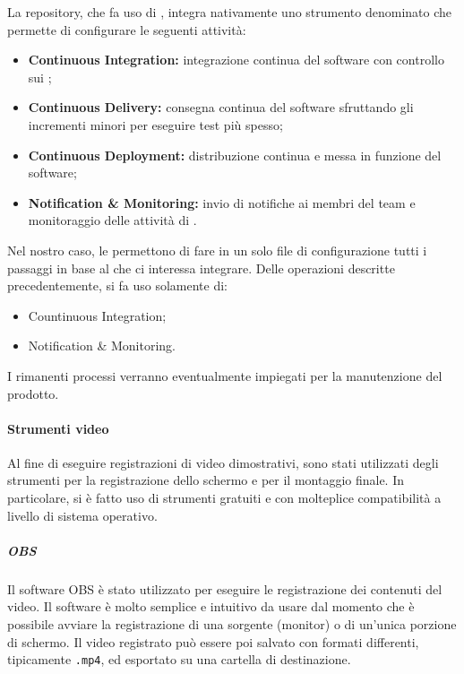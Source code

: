 		La repository, che fa uso di , integra nativamente uno strumento denominato  che permette di configurare le seguenti attività:
		\begin{itemize}
			\item \textbf{Continuous Integration:} integrazione continua del software con controllo sui ;
			\item \textbf{Continuous Delivery:} consegna continua del software sfruttando gli incrementi minori per eseguire test più spesso;
			\item \textbf{Continuous Deployment:} distribuzione continua e messa in funzione del software;
			\item \textbf{Notification \& Monitoring:} invio di notifiche ai membri del team e monitoraggio delle attività di .
		\end{itemize}
		Nel nostro caso, le  permettono di fare in un solo file di configurazione tutti i passaggi in base al  che ci interessa integrare. 
		\newline
		Delle operazioni descritte precedentemente, si fa uso solamente di:
		\begin{itemize}
			\item Countinuous Integration;
			\item Notification \& Monitoring.
		\end{itemize}
		I rimanenti processi verranno eventualmente impiegati per la manutenzione del prodotto.

	\paragraph{Strumenti video}

	Al fine di eseguire registrazioni di video dimostrativi, sono stati utilizzati degli strumenti per la registrazione dello schermo e per il montaggio finale. In particolare, si è fatto uso di strumenti gratuiti e con molteplice compatibilità a livello di sistema operativo.

	\subparagraph{OBS}

	Il software OBS è stato utilizzato per eseguire le registrazione dei contenuti del video. Il software è molto semplice e intuitivo da usare dal momento che è possibile avviare la registrazione di una sorgente (monitor) o di un'unica porzione di schermo. Il video registrato può essere poi salvato con formati differenti, tipicamente \verb!.mp4!, ed esportato su una cartella di destinazione. 

